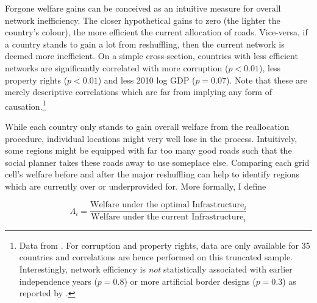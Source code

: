 \documentclass[11pt, oneside]{article}   	%
\begin{document}
Forgone welfare gains can be conceived as an intuitive measure for overall network inefficiency. The closer hypothetical gains to zero (the lighter the country's colour), the more efficient the current allocation of roads. Vice-versa, if a country stands to gain a lot from reshuffling, then the current network is deemed more inefficient. On a simple cross-section, countries with less efficient networks are significantly correlated with more corruption ($p < 0.01$), less property rights ($p < 0.01$) and less 2010 log GDP ($p=0.07$). Note that these are merely descriptive correlations which are far from implying any form of causation.\footnote{Data from \cite{the_world_bank_world_2017}. For corruption and property rights, data are only available for 35 countries and correlations are hence performed on this truncated sample. Interestingly, network efficiency is \emph{not} statistically associated with earlier independence years ($p=0.8$) or more artificial border designs ($p=0.3$) as reported by \cite{Alesina_ArtificialStates_2011}.}

While each country only stands to gain overall welfare from the reallocation procedure, individual locations might very well lose in the process. Intuitively, some regions might be equipped with far too many good roads such that the social planner takes these roads away to use someplace else. Comparing each grid cell's welfare before and after the major reshuffling can help to identify regions which are currently over or underprovided for. More formally, I define

\begin{equation}
  \Lambda_{i} = \frac{\textrm{Welfare under the optimal Infrastructure}_{i}}{\textrm{Welfare under the current Infrastructure}_{i}}
\end{equation}
\end{document}
